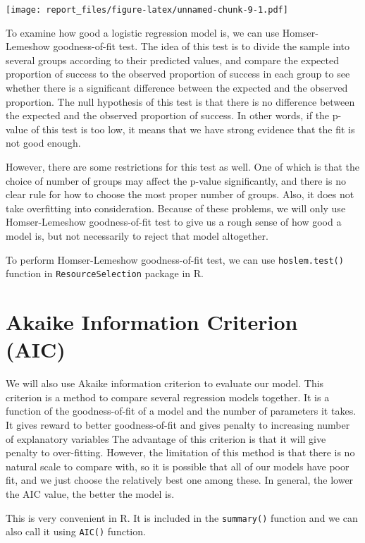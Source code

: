 \documentclass[12pt, oneside]{book}
\theoremstyle{definition}
\theoremstyle{definition}
\theoremstyle{definition}
\theoremstyle{remark}
\begin{document}
\texttt{[image: report\_files/figure-latex/unnamed-chunk-9-1.pdf]}

To examine how good a logistic regression model is, we can use
Homser-Lemeshow goodness-of-fit test. The idea of this test is to divide
the sample into several groups according to their predicted values, and
compare the expected proportion of success to the observed proportion of
success in each group to see whether there is a significant difference
between the expected and the observed proportion. The null hypothesis of
this test is that there is no difference between the expected and the
observed proportion of success. In other words, if the p-value of this
test is too low, it means that we have strong evidence that the fit is
not good enough.

However, there are some restrictions for this test as well. One of which
is that the choice of number of groups may affect the p-value
significantly, and there is no clear rule for how to choose the most
proper number of groups. Also, it does not take overfitting into
consideration. Because of these problems, we will only use
Homser-Lemeshow goodness-of-fit test to give us a rough sense of how
good a model is, but not necessarily to reject that model altogether.

To perform Homser-Lemeshow goodness-of-fit test, we can use
\texttt{hoslem.test()} function in \texttt{ResourceSelection} package in
R.

\hypertarget{akaike-information-criterion-aic}{%
\section{Akaike Information Criterion
(AIC)}\label{akaike-information-criterion-aic}}

We will also use Akaike information criterion to evaluate our model.
This criterion is a method to compare several regression models
together. It is a function of the goodness-of-fit of a model and the
number of parameters it takes. It gives reward to better goodness-of-fit
and gives penalty to increasing number of explanatory variables The
advantage of this criterion is that it will give penalty to
over-fitting. However, the limitation of this method is that there is no
natural scale to compare with, so it is possible that all of our models
have poor fit, and we just choose the relatively best one among these.
In general, the lower the AIC value, the better the model is.

This is very convenient in R. It is included in the \texttt{summary()}
function and we can also call it using \texttt{AIC()} function.
\end{document}
